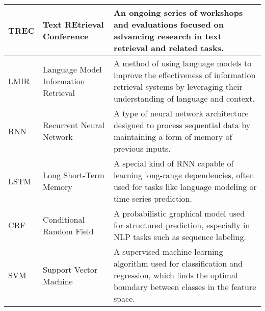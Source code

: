 \begin{tabularx}{\textwidth}{
  >{\raggedright\arraybackslash}p{2.5cm}
  >{\raggedright\arraybackslash}p{4cm}
  >{\noindent\justifying\arraybackslash}X
}
\cmidrule(lr){1-3}
TREC  & Text REtrieval Conference & An ongoing series of workshops and evaluations focused on advancing research in text retrieval and related tasks. \\
\cmidrule(lr){1-3}
LMIR & Language Model Information Retrieval & A method of using language models to improve the effectiveness of information retrieval systems by leveraging their understanding of language and context. \\
\cmidrule(lr){1-3}
RNN   & Recurrent Neural Network & A type of neural network architecture designed to process sequential data by maintaining a form of memory of previous inputs. \\
\cmidrule(lr){1-3}
LSTM  & Long Short-Term Memory & A special kind of RNN capable of learning long-range dependencies, often used for tasks like language modeling or time series prediction. \\
\cmidrule(lr){1-3}
CRF   & Conditional Random Field & A probabilistic graphical model used for structured prediction, especially in NLP tasks such as sequence labeling. \\
\cmidrule(lr){1-3}
SVM   & Support Vector Machine & A supervised machine learning algorithm used for classification and regression, which finds the optimal boundary between classes in the feature space. \\
\bottomrule
\end{tabularx}
